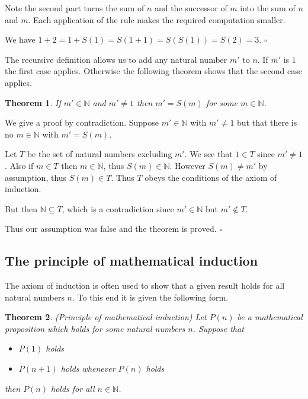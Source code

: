 \documentclass[10pt]{article}
\newcommand{\N}{\mathbb{N}}
\newcommand{\qed}{\square}
\newtheorem{theorem}{Theorem}[section]
\newenvironment{proof}[1][Proof]{\begin{trivlist}
\item[\hskip \labelsep {\bfseries #1}]}{\end{trivlist}}
\newenvironment{example}[1][Example]{\begin{trivlist}
\item[\hskip \labelsep {\bfseries #1}]}{\end{trivlist}}
\begin{document}
Note the second part turns the sum of $n$ and the successor of $m$ into the sum of $n$ and $m$. Each application of the rule makes the required computation smaller.

\begin{example}
We have $1 + 2 = 1 + S(1) = S(1 + 1) = S(S(1)) = S(2) = 3$. $\qed$
\end{example}

The recursive definition allows us to add any natural number $m'$ to $n$. If $m'$ is $1$ the first case applies. Otherwise the following theorem shows that the second case applies.

\begin{theorem}
If $m' \in \N$ and $m' \neq 1$ then $m' = S(m)$ for some $m \in \N$.
\end{theorem}

\begin{proof}
We give a proof by contradiction. Suppose $m' \in \N$ with $m' \neq 1$ but that there is no $m \in \N$ with $m' = S(m)$.

Let $T$ be the set of natural numbers excluding $m'$. We see that $1 \in T$ since $m' \neq 1$. Also if $m \in T$ then $m \in \N$, thus $S(m) \in \N$. However $S(m) \neq m'$ by assumption, thus $S(m) \in T$. Thus $T$ obeys the conditions of the axiom of induction.

But then $\N \subseteq T$, which is a contradiction since $m' \in \N$ but $m' \notin T$.

Thus our assumption was false and the theorem is proved. $\qed$
\end{proof}

\subsection{The principle of mathematical induction}

The axiom of induction is often used to show that a given result holds for all natural numbers $n$. To this end it is given the following form.

\begin{theorem} (Principle of mathematical induction)
Let $P(n)$ be a mathematical proposition which holds for some natural numbers $n$. Suppose that
\begin{itemize}
\item $P(1)$ holds
\item $P(n + 1)$ holds whenever $P(n)$ holds
\end{itemize}
then $P(n)$ holds for all $n \in \N$.
\end{theorem}
\end{document}
